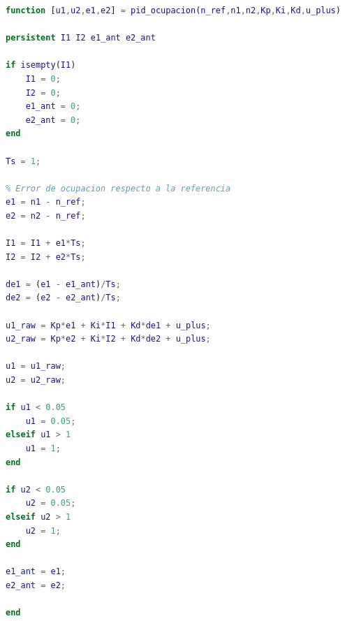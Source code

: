 \begin{lstlisting}[language=Matlab,caption={Función del PID local de ocupación para las esteras R2ET},label={lst:pid_ocupacion}]
function [u1,u2,e1,e2] = pid_ocupacion(n_ref,n1,n2,Kp,Ki,Kd,u_plus)

persistent I1 I2 e1_ant e2_ant

if isempty(I1)
    I1 = 0;
    I2 = 0;
    e1_ant = 0;
    e2_ant = 0;
end

Ts = 1;

% Error de ocupacion respecto a la referencia
e1 = n1 - n_ref;
e2 = n2 - n_ref;

I1 = I1 + e1*Ts;
I2 = I2 + e2*Ts;

de1 = (e1 - e1_ant)/Ts;
de2 = (e2 - e2_ant)/Ts;

u1_raw = Kp*e1 + Ki*I1 + Kd*de1 + u_plus;
u2_raw = Kp*e2 + Ki*I2 + Kd*de2 + u_plus;

u1 = u1_raw;
u2 = u2_raw;

if u1 < 0.05
    u1 = 0.05;
elseif u1 > 1
    u1 = 1;
end

if u2 < 0.05
    u2 = 0.05;
elseif u2 > 1
    u2 = 1;
end

e1_ant = e1;
e2_ant = e2;

end
\end{lstlisting}
